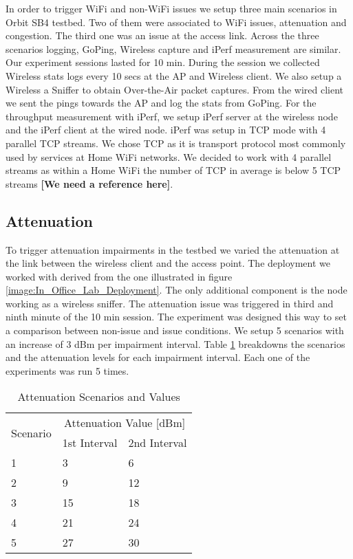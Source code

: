 In order to trigger WiFi and non-WiFi issues we setup three main scenarios in Orbit SB4 testbed. Two of them were associated to WiFi issues, attenuation and congestion. The third one was an issue at the access link. Across the three scenarios logging, GoPing, Wireless capture and iPerf measurement are similar. Our experiment sessions lasted for 10 min. During the session we collected Wireless stats logs every 10 secs at the AP and Wireless client. We also setup a Wireless a Sniffer to obtain Over-the-Air packet captures. From the wired client we sent the pings towards the AP and log the stats from GoPing. For the throughput measurement with iPerf, we setup iPerf server at the wireless node and the iPerf client at the wired node. iPerf was setup in TCP mode with 4 parallel TCP streams. We chose TCP as it is transport protocol most commonly used by services at Home WiFi networks. We decided to work with 4 parallel streams as within a Home WiFi the number of TCP in average is below 5 TCP streams \textbf{[We need a reference here]}.

\subsection*{Attenuation}

To trigger attenuation impairments in the testbed we varied the attenuation at the link between the wireless client and the access point. The deployment we worked with derived from the one illustrated in figure \ref{image:In_Office_Lab_Deployment}.  The only additional component is the node working as a wireless sniffer. The attenuation issue was triggered in third and ninth minute of the 10 min session. The experiment was designed this way to set a comparison between non-issue and issue conditions. We setup 5 scenarios with an increase of 3 dBm per impairment interval. Table \ref{table:Attenuation_Experiment_Values} breakdowns the scenarios and the attenuation levels for each impairment interval. Each one of the experiments was run 5 times.

\begin{table}[h!]
	\begin{center}
		\begin{tabular}{|| m{5em} | m{2cm}| m{2cm} ||}
			\hline
			\multirow{2}{*}{Scenario} & \multicolumn{2}{c||}{Attenuation Value {[}dBm{]}} \\ \cline{2-3} 
			& \multicolumn{1}{l|}{1st Interval} & \multicolumn{1}{l||}{2nd Interval} \\ \hline\hline
			1 & 3 & 6 \\ \hline
			2 & 9 & 12 \\ \hline
			3 & 15 & 18 \\ \hline
			4 & 21 & 24 \\ \hline
			5 & 27 & 30 \\ \hline
		\end{tabular}
	\end{center}
	\caption{Attenuation Scenarios and Values}
	\label{table:Attenuation_Experiment_Values}
\end{table}

